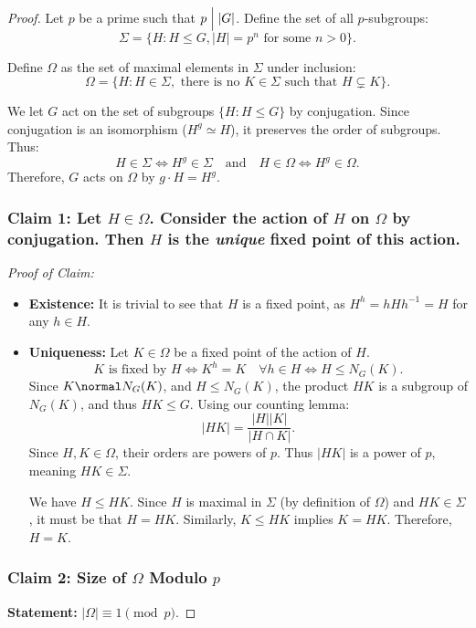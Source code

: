 \documentclass[a4paper,12pt]{article}
\begin{document}
\begin{proof}
    Let $p$ be a prime such that $p \Bigm| |G|$. Define the set of all $p$-subgroups:
    \[
    \Sigma = \{ H : H \leq G, |H| = p^n \text{ for some } n > 0 \}
    .\]
    
    Define $\Omega$ as the set of maximal elements in $\Sigma$ under inclusion:
    \[
    \Omega = \{ H : H \in \Sigma, \text{ there is no } K \in \Sigma \text{ such that } H \subsetneq K \}
    .\]
    
    We let $G$ act on the set of subgroups $\{H : H \leq G\}$ by conjugation. Since conjugation is an isomorphism ($H^g \simeq H$), it preserves the order of subgroups. Thus:
    \[ H \in \Sigma \iff H^g \in \Sigma \quad \text{and} \quad H \in \Omega \iff H^g \in \Omega. \]
    Therefore, $G$ acts on $\Omega$ by $g \cdot H = H^g$.

    \subsubsection*{Claim 1: Let $H \in \Omega$. Consider the action of $H$ on $\Omega$ by conjugation. Then $H$ is the \emph{unique} fixed point of this action.}
    \textit{Proof of Claim:}
    \begin{itemize}
        \item \textbf{Existence:} It is trivial to see that $H$ is a fixed point, as $H^h = hHh^{-1} = H$ for any $h \in H$.
        \item \textbf{Uniqueness:} Let $K \in \Omega$ be a fixed point of the action of $H$.
        \[
        K \text{ is fixed by } H \iff K^h = K \quad \forall h \in H \iff H \leq N_G(K).
        \]
        Since $K \normal N_G(K)$, and $H \leq N_G(K)$, the product $HK$ is a subgroup of $N_G(K)$, and thus $HK \leq G$.
        Using our counting lemma:
        \[
        |HK| = \frac{|H||K|}{|H \cap K|}.
        \]
        Since $H, K \in \Omega$, their orders are powers of $p$. Thus $|HK|$ is a power of $p$, meaning $HK \in \Sigma$.
        
        We have $H \leq HK$. Since $H$ is maximal in $\Sigma$ (by definition of $\Omega$) and $HK \in \Sigma$, it must be that $H = HK$. Similarly, $K \leq HK$ implies $K = HK$.
        Therefore, $H = K$.
    \end{itemize}

    \subsubsection*{Claim 2: Size of $\Omega$ Modulo $p$}
    \textbf{Statement:} $|\Omega| \equiv 1 \pmod{p}$.
    

\end{proof}
\end{document}
